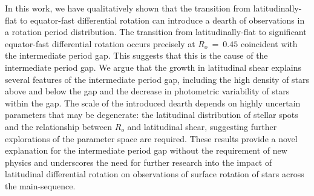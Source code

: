 In this work, we have qualitatively shown that the transition from latitudinally-flat to equator-fast differential rotation can introduce a dearth of observations in a rotation period distribution.
The transition from latitudinally-flat to significant equator-fast differential rotation occurs precisely at $R_o \ = \ 0.45$ coincident with the intermediate period gap.
This suggests that this is the cause of the intermediate period gap.
We argue that the growth in latitudinal shear explains several features of the intermediate period gap, including the high density of stars above and below the gap and the decrease in photometric variability of stars within the gap.
The scale of the introduced dearth depends on highly uncertain parameters that may be degenerate: the latitudinal distribution of stellar spots and the relationship between $R_o$ and latitudinal shear, suggesting further explorations of the parameter space are required.
These results provide a novel explanation for the intermediate period gap without the requirement of new physics and underscores the need for further research into the impact of latitudinal differential rotation on observations of surface rotation of stars across the main-sequence.

